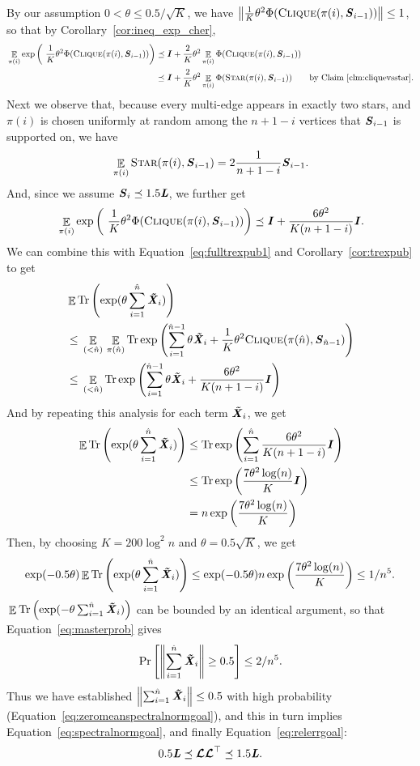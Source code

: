 By our assumption $0 <\theta \leq 0.5/\sqrt{K}$, we have
$\left\| \frac{1}{K}\theta^2\Phi(\textsc{Clique}\!\left({\pi(i),\boldsymbol{\mathit{S}}_{i-1}}\right)) \right\|
\leq 1$, so that by Corollary~\ref{cor:ineq_exp_cher},
\begin{align}
  \Ex{\pi(i)}
  \exp\left(\
     \frac{1}{K}\theta^2\Phi(\vcliq{\pi(i)}{\SS_{i-1}})
  \right)
  &\preceq
  \II
  +
  \frac{2}{K} \theta^2\Ex{\pi(i)}
    \Phi(\vcliq{\pi(i)}{\SS_{i-1}})
  \\
  &\preceq
  \II
  +
  \frac{2}{K} \theta^2\Ex{\pi(i)}
  \Phi(\vstar{\pi(i)}{\SS_{i-1}})
  \tag*{by Claim~\ref{clm:cliquevsstar}.}
\end{align}
Next we observe that, because every multi-edge appears in exactly two
stars, and $\pi(i)$ is chosen uniformly at random among the $n+1-i$
vertices that $\boldsymbol{\mathit{S}}_{i-1}$ is supported on, we have
\[
  {}\mathop{\mathbb{E}}_{\pi(i)}
  \textsc{Star}\!\left({\pi(i),\boldsymbol{\mathit{S}}_{i-1}}\right)
  =
  2\frac{1}{n+1-i}\boldsymbol{\mathit{S}}_{i-1}
  .
\]
And, since we assume $\boldsymbol{\mathit{S}}_{i} \preceq 1.5 \boldsymbol{\mathit{L}}$, we further get
\[
  {}\mathop{\mathbb{E}}_{\pi(i)}
  \exp\left(\
     \frac{1}{K}\theta^2\Phi(\textsc{Clique}\!\left({\pi(i),\boldsymbol{\mathit{S}}_{i-1}}\right))
  \right)
  \preceq
  \boldsymbol{\mathit{I}}
  +
  \frac{6\theta^2}{K(n+1-i)}\boldsymbol{\mathit{I}}
  .
\]
We can combine this with Equation~\eqref{eq:fulltrexpub1} and
Corollary~\ref{cor:trexpub} to get
\begin{align*}
  &  {}\mathop{\mathbb{E}}_{}\mathrm{Tr} \left(\exp(\theta\sum_{i = 1}^{\hat{n}}\boldsymbol{\mathit{\tilde{X}}}_{i} ) \right)
     \\*  \nonumber
  &  \leq
    {}\mathop{\mathbb{E}}_{(<\hat{n})} {}\mathop{\mathbb{E}}_{\pi(\hat{n})}
   \mathrm{Tr}\exp\left(\sum_{i = 1}^{\hat{n}-1}\theta\boldsymbol{\mathit{\tilde{X}}}_{i}
     +
     \frac{1}{K}\theta^2\textsc{Clique}\!\left({\pi(\hat{n}),\boldsymbol{\mathit{S}}_{\hat{n}-1}}\right)
    \right)
\\  \nonumber
  &  \leq
    {}\mathop{\mathbb{E}}_{(<\hat{n})}
   \mathrm{Tr}\exp\left(\sum_{i = 1}^{\hat{n}-1}\theta\boldsymbol{\mathit{\tilde{X}}}_{i}
     +
    \frac{6\theta^2}{K(n+1-i)}\boldsymbol{\mathit{I}}
  \right)
\end{align*}
And by repeating this analysis for each term $\boldsymbol{\mathit{\tilde{X}}}_{i}$, we get
\begin{align*}
 {}\mathop{\mathbb{E}}_{}\mathrm{Tr} \left(\exp(\theta\sum_{i = 1}^{\hat{n}}\boldsymbol{\mathit{\tilde{X}}}_{i} ) \right)
&\leq
   \mathrm{Tr}\exp\left(\sum_{i = 1}^{\hat{n}}
    \frac{6\theta^2}{K(n+1-i)}\boldsymbol{\mathit{I}}
    \right)
\\
  &\leq
\mathrm{Tr}\exp\left(
    \frac{7\theta^2\log(n)}{K}\boldsymbol{\mathit{I}}
    \right)
\\
  &=
    n\exp\left(
    \frac{7\theta^2\log(n)}{K}
    \right)
\end{align*}
Then, by choosing $K = 200 \log^2 n$ and $\theta = 0.5 \sqrt{K}$,
we get
\[
\exp(-0.5 \theta ) {}\mathop{\mathbb{E}}_{}\mathrm{Tr} \left(\exp(\theta\sum_{i =
    1}^{\hat{n}}\boldsymbol{\mathit{\tilde{X}}}_{i} ) \right)
\leq
\exp(-0.5 \theta )
 n\exp\left(
    \frac{7\theta^2\log(n)}{K}
  \right)
  \leq
  1/n^5.
\]
${}\mathop{\mathbb{E}}_{}\mathrm{Tr} \left(\exp(-\theta\sum_{i =
    1}^{\hat{n}}\boldsymbol{\mathit{\tilde{X}}}_{i} ) \right)$ can be bounded by an identical
argument, so that Equation~\eqref{eq:masterprob} gives
\[
  \Pr\left[ \left\| 
\sum_{i =
    1}^{\hat{n}}\boldsymbol{\mathit{\tilde{X}}}_{i}
   \right\| \geq 0.5 \right] \leq 2/n^5.
  \]
Thus we have established $\left\| 
\sum_{i =
    1}^{\hat{n}}\boldsymbol{\mathit{\tilde{X}}}_{i}
   \right\| \leq 0.5 $ with high probability
  (Equation~\eqref{eq:zeromeanspectralnormgoal}), and this in turn
  implies Equation~\eqref{eq:spectralnormgoal}, and finally
  Equation~\eqref{eq:relerrgoal}:
  \[
0.5 \boldsymbol{\mathit{L}}
\preceq
\boldsymbol{\mathit{{\mathcal{L}}}} \boldsymbol{\mathit{{\mathcal{L}}}}^{\top}
\preceq 1.5 \boldsymbol{\mathit{L}}
.
\]

